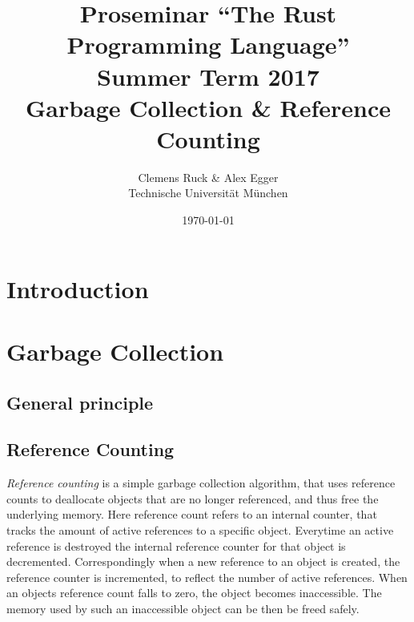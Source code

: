 \documentclass[twocolumn]{article}
\author{Clemens Ruck \& Alex Egger\\ Technische Universit\"at M\"unchen}
\title{Proseminar ``The Rust Programming Language'' \\
       Summer Term 2017 \\
       {\bf Garbage Collection \& Reference Counting}
}
\date{\today}
\begin{document}
\maketitle

\begin{abstract}
\end{abstract}

\section{Introduction}

\label{introduction}
\section{Garbage Collection}
\subsection{General principle}
\subsection{Reference Counting}
\textit{Reference counting} is a simple garbage collection algorithm, that uses reference counts to deallocate objects that are no longer referenced, and thus free the underlying memory.
Here reference count refers to an internal counter, that tracks the amount of active references to a specific object.
Everytime an active reference is destroyed the internal reference counter for that object is decremented.
Correspondingly when a new reference to an object is created, the reference counter is incremented, to reflect the number of active references.
When an objects reference count falls to zero, the object becomes inaccessible.
The memory used by such an inaccessible object can be then be freed safely.
\end{document}

